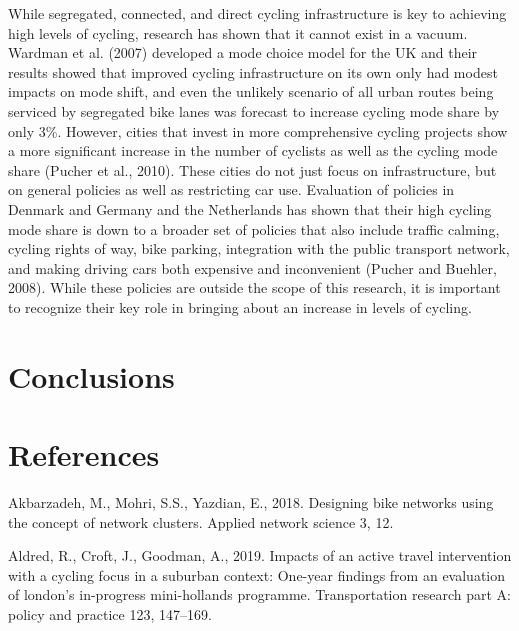 \documentclass[
]{article}
\begin{document}
While segregated, connected, and direct cycling infrastructure is key to
achieving high levels of cycling, research has shown that it cannot
exist in a vacuum. Wardman et al. (2007) developed a mode choice model
for the UK and their results showed that improved cycling infrastructure
on its own only had modest impacts on mode shift, and even the unlikely
scenario of all urban routes being serviced by segregated bike lanes was
forecast to increase cycling mode share by only 3\%. However, cities
that invest in more comprehensive cycling projects show a more
significant increase in the number of cyclists as well as the cycling
mode share (Pucher et al., 2010). These cities do not just focus on
infrastructure, but on general policies as well as restricting car use.
Evaluation of policies in Denmark and Germany and the Netherlands has
shown that their high cycling mode share is down to a broader set of
policies that also include traffic calming, cycling rights of way, bike
parking, integration with the public transport network, and making
driving cars both expensive and inconvenient (Pucher and Buehler, 2008).
While these policies are outside the scope of this research, it is
important to recognize their key role in bringing about an increase in
levels of cycling.

\hypertarget{conclusions}{%
\section{Conclusions}\label{conclusions}}

\hypertarget{references}{%
\section*{References}\label{references}}

\setlength{\parindent}{-0.5in}
\setlength{\leftskip}{0.5in}
\setlength{\parskip}{8pt}

\hypertarget{refs}{}
\leavevmode\hypertarget{ref-akbarzadeh2018designing}{}%
Akbarzadeh, M., Mohri, S.S., Yazdian, E., 2018. Designing bike networks
using the concept of network clusters. Applied network science 3, 12.

\leavevmode\hypertarget{ref-aldred2019impacts}{}%
Aldred, R., Croft, J., Goodman, A., 2019. Impacts of an active travel
intervention with a cycling focus in a suburban context: One-year
findings from an evaluation of london's in-progress mini-hollands
programme. Transportation research part A: policy and practice 123,
147--169.
\end{document}
